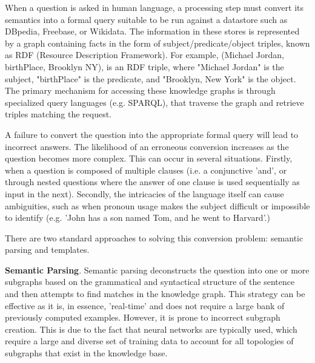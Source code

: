 \documentclass[sigplan,screen]{acmart}
\begin{document}
When a question is asked in human language, a processing step must convert its semantics into a formal query suitable to be run against a datastore such as DBpedia, Freebase, or Wikidata. The information in these stores is represented by a graph containing facts in the form of subject/predicate/object triples, known as RDF (Resource Description Framework). For example, (Michael Jordan, birthPlace, Brooklyn NY), is an RDF triple, where "Michael Jordan" is the subject, "birthPlace" is the predicate, and "Brooklyn, New York" is the object. The primary mechanism for accessing these knowledge graphs is through specialized query languages (e.g. SPARQL), that traverse the graph and retrieve triples matching the request.

A failure to convert the question into the appropriate formal query will lead to incorrect answers. The likelihood of an erroneous conversion increases as the question becomes more complex. This can occur in several situations. Firstly, when a question is composed of multiple clauses (i.e. a conjunctive 'and', or through nested questions where the answer of one clause is used sequentially as input in the next). Secondly, the intricacies of the language itself can cause ambiguities, such as when pronoun usage makes the subject difficult or impossible to identify (e.g. 'John has a son named Tom, and he went to Harvard'.)

There are two standard approaches to solving this conversion problem: semantic parsing and templates.

\textbf{Semantic Parsing}. Semantic parsing deconstructs the question into one or more subgraphs based on the grammatical and syntactical structure of the sentence and then attempts to find matches in the knowledge graph. This strategy can be effective as it is, in essence, 'real-time' and does not require a large bank of previously computed examples. However, it is prone to incorrect subgraph creation. This is due to the fact that neural networks are typically used, which require a large and diverse set of training data to account for all topologies of subgraphs that exist in the knowledge base.
\end{document}
